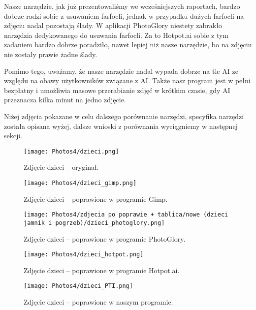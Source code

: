 \documentclass[]{mwart}
\begin{document}
Nasze narzędzie, jak już prezentowaliśmy we wcześniejszych raportach, bardzo dobrze radzi sobie z usuwaniem farfocli, jednak w przypadku dużych farfocli na zdjęciu nadal pozostają ślady. W aplikacji PhotoGlory niestety zabrakło narzędzia dedykowanego do usuwania farfocli. Za to Hotpot.ai sobie z tym zadaniem bardzo dobrze poradziło, nawet lepiej niż nasze narzędzie, bo na zdjęciu nie zostały prawie żadne ślady.

Pomimo tego, uważamy, że nasze narzędzie nadal wypada dobrze na tle AI ze względu na obawy użytkowników związane z AI. Także nasz program jest w pełni bezpłatny i umożliwia masowe przerabianie zdjęć w krótkim czasie, gdy AI przeznacza kilka minut na jedno zdjęcie.

Niżej zdjęcia pokazane w celu dalszego porównanie narzędzi, specyfika narzędzi została opisana wyżej, dalsze wnioski z porównania wyciągniemy w następnej sekcji.

\newpage

\begin{figure}[H]
    \centering
    \texttt{[image: Photos4/dzieci.png]}
    \caption{Zdjęcie dzieci -- oryginał.}
\end{figure}
\begin{figure}[H]
    \centering
    \texttt{[image: Photos4/dzieci\_gimp.png]}
    \caption{Zdjęcie dzieci -- poprawione w programie Gimp. }
\end{figure}
\begin{figure}[H]
    \centering
    \texttt{[image: Photos4/zdjecia po poprawie + tablica/nowe (dzieci jamnik i pogrzeb)/dzieci\_photoglory.png]}
    \caption{Zdjęcie dzieci -- poprawione w programie PhotoGlory.}
\end{figure}
\begin{figure}[H]
    \centering
    \texttt{[image: Photos4/dzieci\_hotpot.png]}
    \caption{Zdjęcie dzieci -- poprawione w programie Hotpot.ai.}
\end{figure}
\begin{figure}[H]
    \centering
    \texttt{[image: Photos4/dzieci\_PTI.png]}
    \caption{Zdjęcie dzieci -- poprawione w naszym programie. }
\end{figure}
\end{document}
